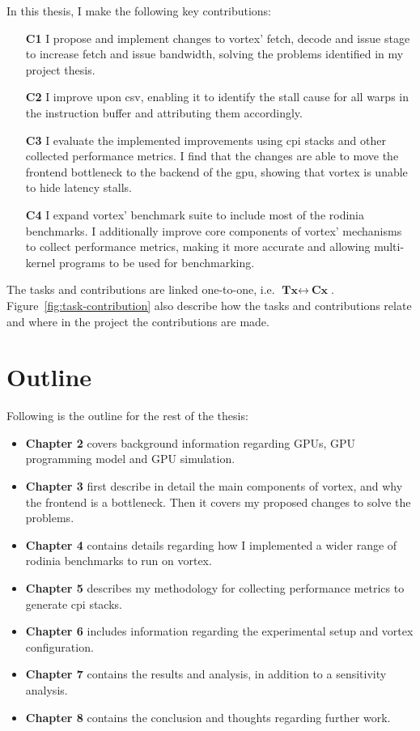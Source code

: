 In this thesis, I make the following key contributions:
\begin{itemize}
    \item[\textbf{C1}] I propose and implement changes to \Gls{vortex}' fetch, decode and issue stage to increase fetch and issue bandwidth, solving the problems identified in my project thesis.
    \item[\textbf{C2}] I improve upon \acrshort{csv}, enabling it to identify the stall cause for all warps in the instruction buffer and attributing them accordingly.
    \item[\textbf{C3}] I evaluate the implemented improvements using \acrshort{cpi} stacks and other collected performance metrics. I find that the changes are able to move the frontend bottleneck to the backend of the \Gls{gpu}, showing that \Gls{vortex} is unable to hide latency stalls.
    \item[\textbf{C4}] I expand \Gls{vortex}' benchmark suite to include most of the \Gls{rodinia} benchmarks. I additionally improve core components of \Gls{vortex}' mechanisms to collect performance metrics, making it more accurate and allowing multi-kernel programs to be used for benchmarking.  
\end{itemize}

The tasks and contributions are linked one-to-one, i.e. $\textbf{Tx}\leftrightarrow~\textbf{Cx}$. Figure~\ref{fig:task-contribution} also describe how the tasks and contributions relate and where in the project the contributions are made.

\section{Outline}

Following is the outline for the rest of the thesis:

\begin{itemize}
    \item \textbf{Chapter 2} covers background information regarding GPUs, GPU programming model and GPU simulation.
    \item \textbf{Chapter 3} first describe in detail the main components of \Gls{vortex}, and why the frontend is a bottleneck. Then it covers my proposed changes to solve the problems.
    \item \textbf{Chapter 4} contains details regarding how I implemented a wider range of \Gls{rodinia} benchmarks to run on \Gls{vortex}.
    \item \textbf{Chapter 5} describes my methodology for collecting performance metrics to generate \acrshort{cpi} stacks.
    \item \textbf{Chapter 6} includes information regarding the experimental setup and \Gls{vortex} configuration.
    \item \textbf{Chapter 7} contains the results and analysis, in addition to a sensitivity analysis.
    \item \textbf{Chapter 8} contains the conclusion and thoughts regarding further work.
\end{itemize}

